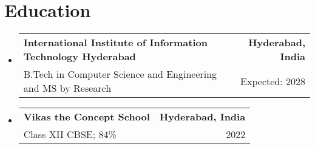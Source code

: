 \documentclass[a4paper,10pt]{article}
\makeatletter
\newcommand{\resumeSubheading}[4]{
  \vspace{-2pt}\item
    \begin{tabular*}{0.97\textwidth}[t]{l@{\extracolsep{\fill}}r}
      \textbf{#1} & \textbf{\small #2} \\
      {\small #3} & {\small #4} \\
    \end{tabular*}\vspace{-7pt}
}
\makeatother
\begin{document}
\section{Education}
\begin{itemize}[leftmargin=0.15in, label={}]
    \resumeSubheading
        {International Institute of Information Technology Hyderabad}{Hyderabad, India}
        {B.Tech in Computer Science and Engineering and MS by Research}{Expected: 2028}
    \resumeSubheading
        {Vikas the Concept School}{Hyderabad, India}
        {Class XII CBSE; 84\%}{2022}
\end{itemize}
\end{document}
